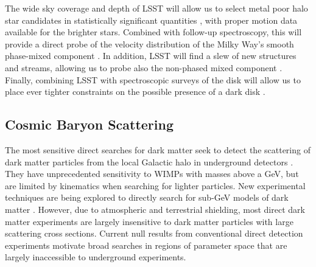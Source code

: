 The wide sky coverage and depth of LSST will allow us to select metal poor halo star candidates in statistically significant quantities \citep[\eg,][]{2017MNRAS.471.2587S}, with proper motion data available for the brighter stars. Combined with follow-up spectroscopy, this will provide a direct probe of the velocity distribution of the Milky Way's smooth phase-mixed component \citep{2018PhRvL.120d1102H}. In addition, LSST will find a slew of new structures and streams, allowing us to probe also the non-phased mixed component \citep{2005PhRvD..71d3516F,2018arXiv181011468E}. Finally, combining LSST with spectroscopic surveys of the disk will allow us to place ever tighter constraints on the possible presence of a dark disk \citep{2015MNRAS.450.2874R}.



\subsection{Cosmic Baryon Scattering }

The most sensitive direct searches for dark matter seek to detect the scattering of dark matter particles from the local Galactic halo in underground detectors \citep[\eg,][]{1509.08767}. 
They have unprecedented sensitivity to WIMPs with masses above a GeV, but are limited by kinematics when searching for lighter particles. 
New experimental techniques are being explored to directly search for sub-GeV models of dark matter \citep{Battaglieri:2017aum}. 
However, due to atmospheric and terrestrial shielding, most direct dark matter experiments are largely insensitive to dark matter particles with large scattering cross sections. 
Current null results from conventional direct detection experiments motivate broad searches in regions of parameter space that are largely inaccessible to underground experiments. 


